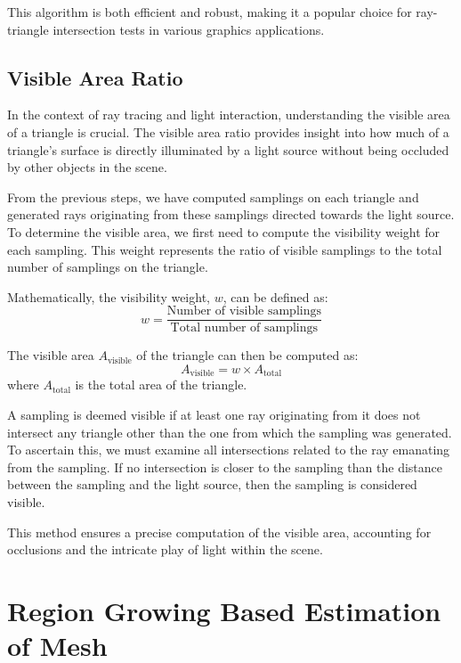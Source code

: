 \documentclass[11pt, a4paper,oneside,chapterprefix=false]{scrbook}
\begin{document}
This algorithm is both efficient and robust, making it a popular choice for ray-triangle intersection tests in various graphics applications.

\subsection{Visible Area Ratio}

In the context of ray tracing and light interaction, understanding the visible area of a triangle is crucial. The visible area ratio provides insight into how much of a triangle's surface is directly illuminated by a light source without being occluded by other objects in the scene.

From the previous steps, we have computed samplings on each triangle and generated rays originating from these samplings directed towards the light source. To determine the visible area, we first need to compute the visibility weight for each sampling. This weight represents the ratio of visible samplings to the total number of samplings on the triangle.

Mathematically, the visibility weight, \( w \), can be defined as:
\begin{equation}
    w = \frac{\text{Number of visible samplings}}{\text{Total number of samplings}}
\end{equation}

The visible area \( A_{\text{visible}} \) of the triangle can then be computed as:
\begin{equation}
    A_{\text{visible}} = w \times A_{\text{total}}
\end{equation}
where \( A_{\text{total}} \) is the total area of the triangle.

A sampling is deemed visible if at least one ray originating from it does not intersect any triangle other than the one from which the sampling was generated. To ascertain this, we must examine all intersections related to the ray emanating from the sampling. If no intersection is closer to the sampling than the distance between the sampling and the light source, then the sampling is considered visible.

This method ensures a precise computation of the visible area, accounting for occlusions and the intricate play of light within the scene.
 
\section{Region Growing Based Estimation of Mesh} \label{sec:region growing mesh estimation}
\end{document}
